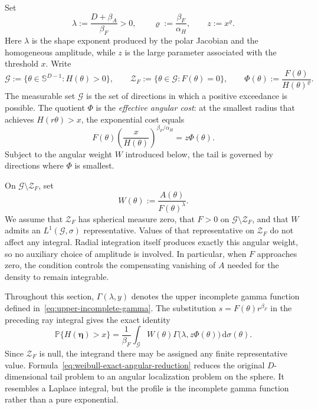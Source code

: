 \documentclass[11pt]{amsart}
\numberwithin{equation}{section}
\theoremstyle{definition}
\theoremstyle{remark}
\newcommand{\dd}{\,\mathrm{d}}
\begin{document}
Set
\begin{equation}\label{eq:weibull-parameters}
 \lambda:=\frac{D+\beta_A}{\beta_F}>0,
 \qquad
 \varrho:=\frac{\beta_F}{\alpha_H},
 \qquad
 z:=x^\varrho.
\end{equation}
Here $\lambda$ is the shape exponent produced by the polar Jacobian and the
homogeneous amplitude, while $z$ is the large parameter associated with the
threshold $x$.  Write
\begin{equation}\label{eq:weibull-angular-data}
 \mathcal G:=\{\theta\in\mathbb S^{D-1}:H(\theta)>0\},
 \qquad
 \mathcal Z_F:=\{\theta\in\mathcal G:F(\theta)=0\},
 \qquad
 \Phi(\theta):=\frac{F(\theta)}{H(\theta)^\varrho}.
\end{equation}
The measurable set $\mathcal G$ is the set of directions in which a positive
exceedance is possible.  The quotient $\Phi$ is the \emph{effective angular
cost}: at the smallest radius that achieves $H(r\theta)>x$, the exponential
cost equals
\[
 F(\theta)\left(\frac{x}{H(\theta)}\right)^{\beta_F/\alpha_H}
 =z\Phi(\theta).
\]
Subject to the angular weight $W$ introduced below, the tail is governed by
directions where $\Phi$ is smallest.

On $\mathcal G\setminus\mathcal Z_F$, set
\begin{equation}\label{eq:weibull-angular-weight}
 W(\theta):=\frac{A(\theta)}{F(\theta)^\lambda}.
\end{equation}
We assume that $\mathcal Z_F$ has spherical measure zero, that $F>0$ on
$\mathcal G\setminus\mathcal Z_F$, and that $W$ admits an $L^1(\mathcal G,\sigma)$
representative.  Values of that representative on $\mathcal Z_F$ do not affect
any integral.  Radial integration itself produces exactly this angular weight,
so no auxiliary choice of amplitude is involved.  In particular, when $F$
approaches zero, the condition controls the compensating vanishing of $A$
needed for the density to remain integrable.

Throughout this section, $\Gamma(\lambda,y)$ denotes the upper incomplete
gamma function defined in~\eqref{eq:upper-incomplete-gamma}.  The substitution
$s=F(\theta)r^{\beta_F}$ in the preceding ray integral gives the
exact identity
\begin{equation}\label{eq:weibull-exact-angular-reduction}
 \mathbb P\{H(\bm\eta)>x\}
 =\frac{1}{\beta_F}\int_{\mathcal G}
 W(\theta)\Gamma\bigl(\lambda,z\Phi(\theta)\bigr)\dd\sigma(\theta).
\end{equation}
Since $\mathcal Z_F$ is null, the integrand there may be assigned any finite
representative value.  Formula~\eqref{eq:weibull-exact-angular-reduction}
reduces the original $D$-dimensional tail problem to an angular localization
problem on the sphere.  It resembles a Laplace integral, but the profile is the
incomplete gamma function rather than a pure exponential.
\end{document}

